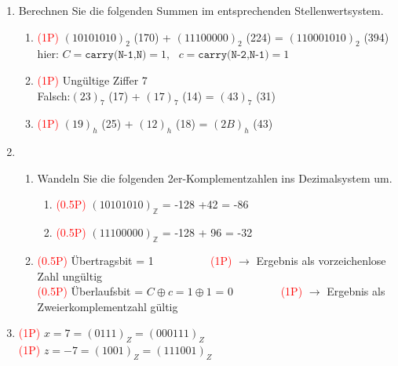 \begin{enumerate}
	\item Berechnen Sie die folgenden Summen im entsprechenden Stellenwertsystem.
	\begin{enumerate}
		\item \textcolor{red}{(1P)} $(10101010)_2$ (170) + $(11100000)_2$ (224) = $(110001010)_2$  (394)\\
		hier: $C=\texttt{carry(N-1,N)}=1,~~~ c=\texttt{carry(N-2,N-1)}=1$
		\item \textcolor{red}{(1P)} Ungültige Ziffer 7 \\
		Falsch:$(23)_7$ (17) + $(17)_7$ (14) = $(43)_7$ (31)
		\item \textcolor{red}{(1P)} $(19)_{h}$  (25) + $(12)_{h}$ (18) = $(2B)_{h}$ (43)
	\end{enumerate}
	\item 
	\begin{enumerate}
		\item Wandeln Sie die folgenden 2er-Komplementzahlen ins Dezimalsystem um.
		\begin{enumerate}
			\item \textcolor{red}{(0.5P)} $(10101010)_{\mathbb{Z}}$ = -128 +42 = -86
			\item \textcolor{red}{(0.5P)} $(11100000)_{\mathbb{Z}}$ = -128 + 96 = -32
		\end{enumerate}
		\item \textcolor{red}{(0.5P)} Übertragsbit = 1  ~~~~~~~~~ \textcolor{red}{(1P)} $\rightarrow$ Ergebnis als vorzeichenlose Zahl ungültig \\
		\textcolor{red}{(0.5P)} Überlaufsbit = $C \oplus c = 1 \oplus 1$ = 0~~~~~~~~ \textcolor{red}{(1P)} $\rightarrow$ Ergebnis als Zweierkomplementzahl gültig 
	\end{enumerate}
	\item \textcolor{red}{(1P)} $x = 7 = (0111)_Z = (000111)_Z$\\
	\textcolor{red}{(1P)} $z = -7 = (1001)_Z = (111001)_Z$

\end{enumerate}
